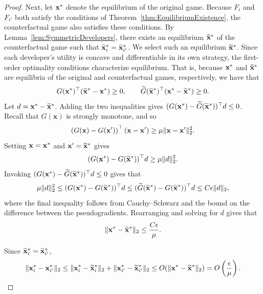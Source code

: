 \begin{proof}
Next, let $\mathbf{x}^*$ denote the equilibrium of the original game. 
Because $F_i$ and $F_{i'}$ both satisfy the conditions of Theorem~\ref{thm:EquilibriumExistence}, the counterfactual game also satisfies these conditions. 
By Lemma~\ref{lem:SymmetricDevelopers}, there exists an equilibrium $\widetilde{\mathbf{x}}^*$ of the counterfactual game such that $\widetilde{\mathbf{x}}_i^*=\widetilde{\mathbf{x}}_{i'}^*$. 
We select such an equilibrium $\widetilde{\mathbf{x}}^*$.
Since each developer's utility is concave and differentiable in its own
strategy, the first-order optimality conditions characterize equilibrium.
That is, because $\mathbf{x}^*$ and $\widetilde{\mathbf{x}}^*$ are equilibria of the original and counterfactual games, respectively, we have that 
\[
G(\mathbf{x}^*)^\top(\widetilde{\mathbf{x}}^*-\mathbf{x}^*)\geq0,\qquad \widetilde G(\widetilde{\mathbf{x}}^*)^\top(\mathbf{x}^*-\widetilde{\mathbf{x}}^*)\geq0.
\]
Let $d=\mathbf{x}^*-\widetilde{\mathbf{x}}^*$. Adding the two inequalities gives $(G(\mathbf{x}^*)-\widetilde G(\widetilde{\mathbf{x}}^*))^\top d\leq0$. 
Recall that $G(\mathbf{x})$ is strongly monotone, and so 
\[
\left(G(\mathbf{x})-G(\mathbf{x}')\right)^\top(\mathbf{x}-\mathbf{x}')
\geq
\mu\lVert\mathbf{x}-\mathbf{x}'\rVert_2^2.
\]
Setting $\mathbf{x}=\mathbf{x}^*$ and $\mathbf{x}'=\widetilde{\mathbf{x}}^*$ gives
\[
(G(\mathbf{x}^*)-G(\widetilde{\mathbf{x}}^*))^\top d\geq\mu\lVert d\rVert_2^2.
\]
Invoking $(G(\mathbf{x}^*)-\widetilde G(\widetilde{\mathbf{x}}^*))^\top d\leq0$ gives that 
\[
\mu\lVert d\rVert_2^2\leq(G(\mathbf{x}^*)-G(\widetilde{\mathbf{x}}^*))^\top d\leq(\widetilde G(\widetilde{\mathbf{x}}^*)-G(\widetilde{\mathbf{x}}^*))^\top d \leq C\epsilon \lVert d\rVert_2,
\]
where the final inequality follows from Cauchy--Schwarz and the bound on the difference between the pseudogradients.
Rearranging and solving for $d$ gives that 
\[
\lVert\mathbf{x}^*-\widetilde{\mathbf{x}}^*\rVert_2\leq\frac{C\epsilon}{\mu}.
\]

Since $\widetilde{\mathbf{x}}_i^*=\widetilde{\mathbf{x}}_{i'}^*$,
\[
\lVert\mathbf{x}_i^*-\mathbf{x}_{i'}^*\rVert_2\leq \lVert\mathbf{x}_i^*-\widetilde{\mathbf{x}}_i^*\rVert_2+\lVert\mathbf{x}_{i'}^*-\widetilde{\mathbf{x}}_{i'}^*\rVert_2\leq O(\lVert\mathbf{x}^*-\widetilde{\mathbf{x}}^*\rVert_2) =O\left(\frac{\epsilon}{\mu}\right).
\]


\end{proof}
